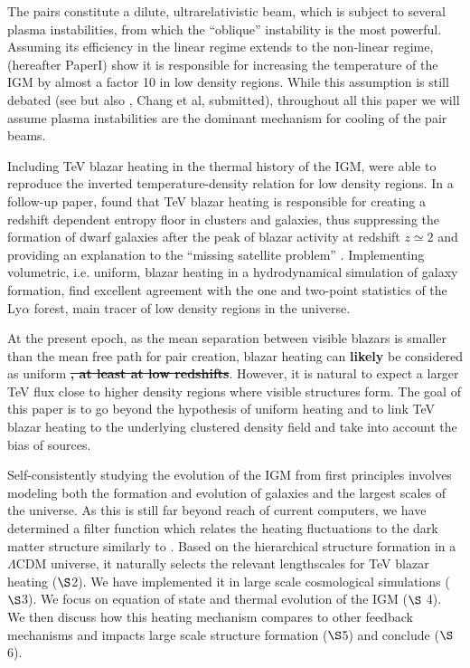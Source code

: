 \documentclass[twocolumns]{emulateapj}
\newcommand\ALc[1]{{\color{red} \bf #1}} %
\begin{document}
The pairs constitute a dilute, ultrarelativistic beam, which is subject to several plasma instabilities, from which the ``oblique'' instability \citep{PhysRevE.70.046401} is the most powerful. Assuming its efficiency in the linear regime extends to the non-linear regime, \citet{2012ApJ...752...23C} (hereafter PaperI) show it is responsible for increasing the temperature of the IGM by almost a factor 10 in low density regions. While this assumption is still debated (see \citet{2013ApJ...770...54M,2014ApJ...787...49S} but also \citet{2013arXiv1311.6752S,2013ApJ...777...49S,2012ApJ...758..102S}, Chang et al, submitted), throughout all this paper we will assume plasma instabilities are the dominant mechanism for cooling of the pair beams.


Including TeV blazar heating in the thermal history of the IGM, \citet{2012ApJ...752...23C} were able to reproduce the inverted temperature-density relation for low density regions. In a follow-up paper, \citet{2012ApJ...752...24P} found that TeV blazar heating is responsible for creating  a redshift dependent entropy floor in clusters and galaxies, thus suppressing the formation of dwarf galaxies after the peak of blazar activity at redshift $z\simeq2$ and providing an explanation to the ``missing satellite problem'' \citep{2010AdAst2010E...8K}. Implementing volumetric, i.e. uniform, blazar heating in a hydrodynamical simulation of galaxy formation, \citet{2012MNRAS.423..149P} find excellent agreement with the one and two-point statistics of the Ly$\alpha$ forest, main tracer of low density regions in the universe.

At the present epoch, as the mean separation between visible blazars is smaller than the mean free path for pair creation, blazar heating can \ALc{likely} be considered as uniform \ALc{\sout{, at least at low redshifts}}. However, it is natural to expect a larger TeV flux close to higher density regions where visible structures form. The goal of this paper is to go beyond the hypothesis of uniform heating and to link TeV blazar heating to the underlying clustered density field and take into account the bias of sources. %

Self-consistently studying the evolution of the IGM from first principles involves modeling both the formation and evolution of galaxies and the largest scales of the universe. As this is still far beyond reach of current computers, we have determined a filter function which relates the heating fluctuations to the dark matter structure similarly to \citet{2007MNRAS.376.1680P,2005ApJ...626....1B,2014PhRvD..89h3010P}. Based on the hierarchical structure formation in a $\Lambda$CDM universe, it naturally selects the relevant lengthscales for TeV blazar heating ($\S$2). We have implemented it in large scale cosmological simulations ($\S$3). We focus on equation of state and thermal evolution of the  IGM ($\S$ 4). We then discuss how this heating mechanism compares to other feedback mechanisms and impacts large scale structure formation ($\S$5) and conclude ($\S$6).
\end{document}
